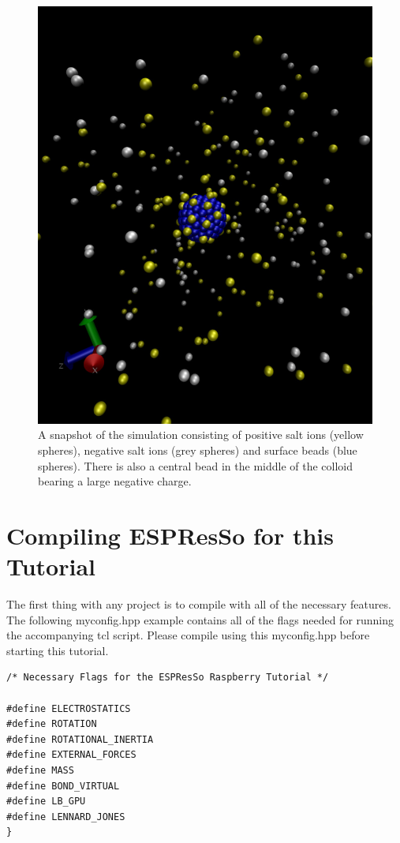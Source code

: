 \documentclass[
paper=a4,                       %
fontsize=11pt,                  %
twoside,                        %
footsepline,                    %
headsepline,                    %
headinclude=false,              %
footinclude=false,              %
pagesize,                       %
]{scrartcl}
\begin{document}
\begin{figure}[]
	\centering
	\includegraphics[width=\linewidth]{raspberry_snapshot}
	\caption{A snapshot of the simulation consisting of positive salt ions (yellow spheres), negative salt ions (grey spheres) and surface beads (blue spheres). There is also a central bead in the middle of the colloid bearing a large negative  charge.}
	\label{fig:rasp_snapshot}
\end{figure} 

\section{Compiling ESPResSo for this Tutorial}\label{sec:compiler_flags}
The first thing with any \es{} project is to compile \es{} with all of the necessary features.
The following myconfig.hpp example contains all of the flags needed for running the accompanying tcl script.
Please compile \es{} using this myconfig.hpp before starting this tutorial.
{\small\vspace{0,2cm}
\begin{lstlisting}[numbers=none]
/* Necessary Flags for the ESPResSo Raspberry Tutorial */

#define ELECTROSTATICS
#define ROTATION
#define ROTATIONAL_INERTIA
#define EXTERNAL_FORCES
#define MASS
#define BOND_VIRTUAL
#define LB_GPU
#define LENNARD_JONES
}\end{lstlisting}\vspace{0,2cm}
}
\end{document}
